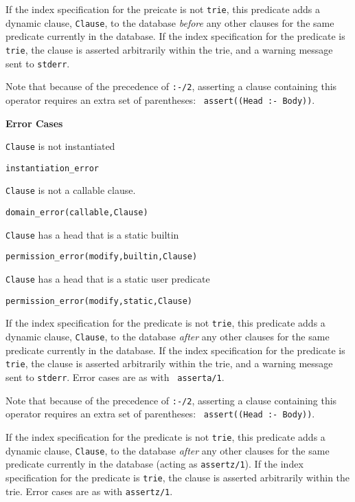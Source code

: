 \begin{description}

%
If the index specification for the preicate is not {\tt trie}, this
predicate adds a dynamic clause, {\tt Clause}, to the database {\em
before} any other clauses for the same predicate currently in the
database.  If the index specification for the predicate is {\tt trie},
the clause is asserted arbitrarily within the trie, and a warning
message sent to {\tt stderr}.

Note that because of the precedence of {\tt :-/2}, asserting a clause
containing this operator requires an extra set of parentheses: {\tt
  assert((Head :- Body))}.

{\bf Error Cases}
\bi
\item 	{\tt Clause} is not instantiated
\bi
\item 	{\tt instantiation\_error}
\ei
%
\item 	{\tt Clause} is not a callable clause.
\bi
\item 	{\tt domain\_error(callable,Clause)}
\ei
%
\item 	{\tt Clause} has a head that is a static builtin
\bi
\item 	{\tt permission\_error(modify,builtin,Clause)}
\ei
\item 	{\tt Clause} has a head that is a static user predicate
\bi
\item 	{\tt permission\_error(modify,static,Clause)}
\ei
%
\ei

%
If the index specification for the predicate is not {\tt trie}, this
predicate adds a dynamic clause, {\tt Clause}, to the database {\em
  after} any other clauses for the same predicate currently in the
database.  If the index specification for the predicate is {\tt trie},
the clause is asserted arbitrarily within the trie, and a warning
message sent to {\tt stderr}.  Error cases are as with {\tt
  asserta/1}.

Note that because of the precedence of {\tt :-/2}, asserting a clause
containing this operator requires an extra set of parentheses: {\tt
  assert((Head :- Body))}.

%
If the index specification for the predicate is not {\tt trie}, this
predicate adds a dynamic clause, {\tt Clause}, to the database {\em
  after} any other clauses for the same predicate currently in the
database (acting as {\tt assertz/1}).  If the index specification for
the predicate is {\tt trie}, the clause is asserted arbitrarily within
the trie.  Error cases are as with {\tt assertz/1}.


\end{description}

